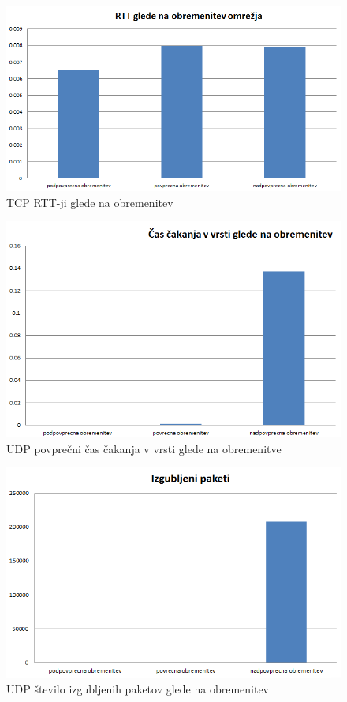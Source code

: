 \documentclass[11pt, a4paper, slovene]{book}
\begin{document}
\begin{figure}[h]
	\centering
	\includegraphics[width=\textwidth]{TCP_RTT_obremenitev_omrezja.png}
	\caption{TCP RTT-ji glede na obremenitev}
	\label{3}	
\end{figure}


\begin{figure}[h]
	\centering
	\includegraphics[width=\textwidth]{UDP_cas_cakanja_obremenitev.png}
	\caption{UDP povprečni čas čakanja v vrsti glede na obremenitve}
	\label{4}	
\end{figure}

\begin{figure}[h]
	\centering
	\includegraphics[width=\textwidth]{UDP_izgubljeni_paketi_obremenitev.png}
	\caption{UDP število izgubljenih paketov glede na obremenitev}
	\label{5}	
\end{figure}
\end{document}
